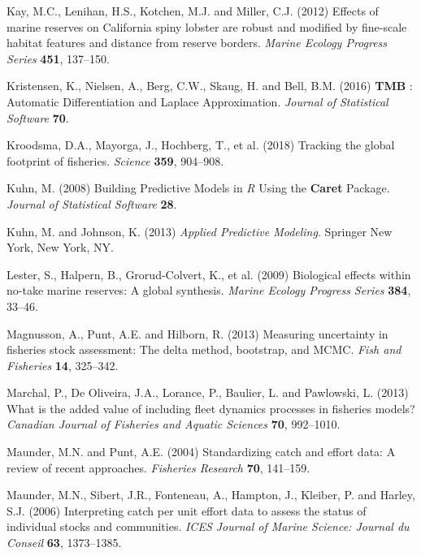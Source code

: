 \documentclass[twoside,12pt,final]{ucthesis-CA2012}
\begin{document}
\begin{ucmainmatter}
\hypertarget{ref-Kay2012}{}
Kay, M.C., Lenihan, H.S., Kotchen, M.J. and Miller, C.J. (2012) Effects
of marine reserves on California spiny lobster are robust and modified
by fine-scale habitat features and distance from reserve borders.
\emph{Marine Ecology Progress Series} \textbf{451}, 137--150.

\hypertarget{ref-Kristensen2016}{}
Kristensen, K., Nielsen, A., Berg, C.W., Skaug, H. and Bell, B.M. (2016)
\textbf{TMB} : Automatic Differentiation and Laplace Approximation.
\emph{Journal of Statistical Software} \textbf{70}.

\hypertarget{ref-Kroodsma2018}{}
Kroodsma, D.A., Mayorga, J., Hochberg, T., et al. (2018) Tracking the
global footprint of fisheries. \emph{Science} \textbf{359}, 904--908.

\hypertarget{ref-Kuhn2008}{}
Kuhn, M. (2008) Building Predictive Models in \emph{R} Using the
\textbf{Caret} Package. \emph{Journal of Statistical Software}
\textbf{28}.

\hypertarget{ref-Kuhn2013}{}
Kuhn, M. and Johnson, K. (2013) \emph{Applied Predictive Modeling}.
Springer New York, New York, NY.

\hypertarget{ref-Lester2009}{}
Lester, S., Halpern, B., Grorud-Colvert, K., et al. (2009) Biological
effects within no-take marine reserves: A global synthesis. \emph{Marine
Ecology Progress Series} \textbf{384}, 33--46.

\hypertarget{ref-Magnusson2013}{}
Magnusson, A., Punt, A.E. and Hilborn, R. (2013) Measuring uncertainty
in fisheries stock assessment: The delta method, bootstrap, and MCMC.
\emph{Fish and Fisheries} \textbf{14}, 325--342.

\hypertarget{ref-Marchal2013}{}
Marchal, P., De Oliveira, J.A., Lorance, P., Baulier, L. and Pawlowski,
L. (2013) What is the added value of including fleet dynamics processes
in fisheries models? \emph{Canadian Journal of Fisheries and Aquatic
Sciences} \textbf{70}, 992--1010.

\hypertarget{ref-Maunder2004}{}
Maunder, M.N. and Punt, A.E. (2004) Standardizing catch and effort data:
A review of recent approaches. \emph{Fisheries Research} \textbf{70},
141--159.

\hypertarget{ref-Maunder2006}{}
Maunder, M.N., Sibert, J.R., Fonteneau, A., Hampton, J., Kleiber, P. and
Harley, S.J. (2006) Interpreting catch per unit effort data to assess
the status of individual stocks and communities. \emph{ICES Journal of
Marine Science: Journal du Conseil} \textbf{63}, 1373--1385.


\end{ucmainmatter}
\end{document}
